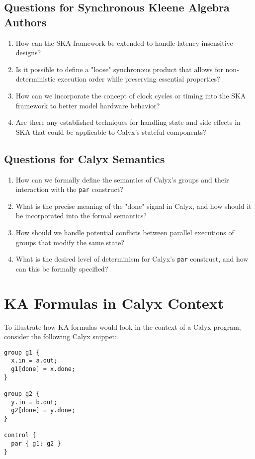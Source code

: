 \documentclass[sigplan,10pt,authorversion,nonacm]{acmart}
\theoremstyle{remark}
\begin{document}
\subsection{Questions for Synchronous Kleene Algebra Authors}
\begin{enumerate}
    \item How can the SKA framework be extended to handle latency-insensitive designs?
    \item Is it possible to define a "loose" synchronous product that allows for non-deterministic execution order while preserving essential properties?
    \item How can we incorporate the concept of clock cycles or timing into the SKA framework to better model hardware behavior?
    \item Are there any established techniques for handling state and side effects in SKA that could be applicable to Calyx's stateful components?
\end{enumerate}

\subsection{Questions for Calyx Semantics}
\begin{enumerate}
    \item How can we formally define the semantics of Calyx's groups and their interaction with the \texttt{par} construct?
    \item What is the precise meaning of the "done" signal in Calyx, and how should it be incorporated into the formal semantics?
    \item How should we handle potential conflicts between parallel executions of groups that modify the same state?
    \item What is the desired level of determinism for Calyx's \texttt{par} construct, and how can this be formally specified?
\end{enumerate}

\section{KA Formulas in Calyx Context}

To illustrate how KA formulas would look in the context of a Calyx program, consider the following Calyx snippet:

\begin{lstlisting}[language=Calyx]
group g1 {
  x.in = a.out;
  g1[done] = x.done;
}

group g2 {
  y.in = b.out;
  g2[done] = y.done;
}

control {
  par { g1; g2 }
}
\end{lstlisting}
\end{document}
